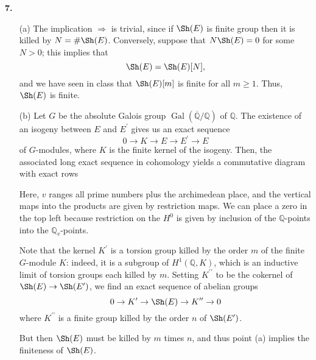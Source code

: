 \documentclass[a4paper]{article}
\newcommand{\Q}{\mathbb{Q}}
\theoremstyle{definition}
\theoremstyle{definition}
\theoremstyle{remark}
\theoremstyle{definition}
\begin{document}
\textbf{7. }
\begin{itemize}
    \item[(a)] The implication $\Rightarrow$ is trivial, since if $\Sh(E)$ is finite group then it is killed by $N=\#\Sh(E)$. Conversely, suppose that $N\Sh(E)=0$ for some $N>0$; this implies that
        \[
            \Sh(E)=\Sh(E)[N],
        \] and we have seen in class that $\Sh(E)[m]$ is finite for all $m\geq 1$. Thus, $\Sh(E)$ is finite.
    \item[(b)] Let $G$ be the absolute Galois group $\operatorname{Gal}(\overline{\Q}/\Q)$ of $\Q$.
        The existence of an isogeny between $E$ and $E^\prime$ gives us an exact sequence
        \[
            0 \to K \to E \to E^\prime \to E
        \]
        of $G$-modules, where $K$ is the finite kernel of the isogeny. Then, the associated long exact sequence in cohomology yields a commutative diagram with exact rows
        \begin{center}
        \end{center}
        Here, $v$ ranges all prime numbers plus the archimedean place, and the vertical maps into the products are given by restriction maps. We can place a zero in the top left because restriction on the $H^0$ is given by inclusion of the $\Q$-points into the $\Q_v$-points.

        Note that the kernel $K^\prime$ is a torsion group killed by the order $m$ of the finite $G$-module $K$: indeed, it is a subgroup of $H^1(\Q,K)$, which is an inductive limit of torsion groups each killed by $m$. Setting $K^{\prime\prime}$ to be the cokernel of $\Sh(E)\to\Sh(E^\prime)$, we find an exact sequence of abelian groups
        \[
            0 \to K^\prime \to \Sh(E) \to K^{\prime\prime} \to 0
        \]
        where $K^{\prime\prime}$ is a finite group killed by the order $n$ of $\Sh(E^\prime)$.

        But then $\Sh(E)$ must be killed by $m$ times $n$, and thus point (a) implies
        the finiteness of $\Sh(E)$.


\end{itemize}
\end{document}
